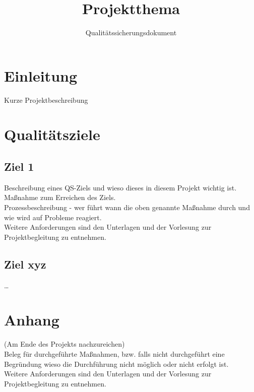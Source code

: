 \documentclass[accentcolor=tud0b,12pt,paper=a4]{tudreport}
\title{Projektthema}
\subtitle{Qualitätssicherungsdokument}
\begin{document}
	\maketitle
	\tableofcontents 
	
	\chapter{Einleitung}
		Kurze Projektbeschreibung
	
	\chapter{Qualitätsziele}
        \section{Ziel 1}
    
		Beschreibung eines QS-Ziels und wieso dieses in diesem Projekt wichtig ist.\\
		Maßnahme zum Erreichen des Ziels.\\
		Prozessbeschreibung - wer führt wann die oben genannte Maßnahme durch und wie wird auf Probleme reagiert.\\
		Weitere Anforderungen sind den Unterlagen und der Vorlesung zur Projektbegleitung zu entnehmen.

        \section{Ziel xyz}
	        \ldots
	        
	
\appendix	
	\chapter{Anhang}
		(Am Ende des Projekts nachzureichen)\\
		Beleg für durchgeführte Maßnahmen, bzw. falls nicht durchgeführt eine Begründung wieso die Durchführung nicht möglich oder nicht erfolgt ist. \\
		Weitere Anforderungen sind den Unterlagen und der Vorlesung zur Projektbegleitung zu entnehmen.
	
\end{document}
